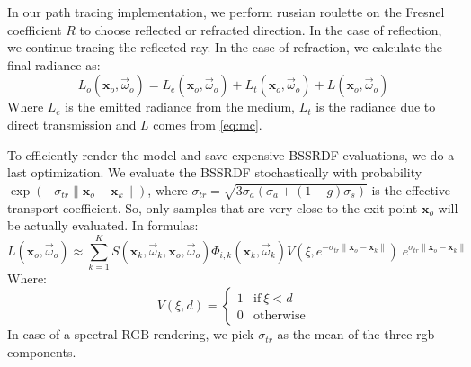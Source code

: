 \documentclass[10pt,a4paper]{article}
\begin{document}
In our path tracing implementation, we perform russian roulette on the Fresnel coefficient $R$ to choose reflected or refracted direction. In the case of reflection, we continue tracing the reflected ray. In the case of refraction, we calculate the final radiance as:
\begin{equation*}
L_o(\mathbf{x}_o, \vec{\omega}_o) = L_e(\mathbf{x}_o, \vec{\omega}_o) + L_t(\mathbf{x}_o, \vec{\omega}_o) + L(\mathbf{x}_o, \vec{\omega}_o) 
\end{equation*}
Where $L_e$ is the emitted radiance from the medium, $L_t$ is the radiance due to direct transmission and $L$ comes from \ref{eq:mc}. 

To efficiently render the model and save expensive BSSRDF evaluations, we do a last optimization. We evaluate the BSSRDF stochastically with probability $\exp(-\sigma_{tr} \| \mathbf{x}_o - \mathbf{x}_k \|)$, where $\sigma_{tr} = \sqrt{3 \sigma_a (\sigma_a + (1-g) \sigma_s)} $ is the effective transport coefficient.  So, only samples that are very close to the exit point $\mathbf{x}_o$ will be actually evaluated. In formulas:
\begin{equation*}
L(\mathbf{x}_o, \vec{\omega}_o) \approx  \sum_{k = 1}^K S(\mathbf{x}_k, \vec{\omega}_k, \mathbf{x}_o, \vec{\omega}_o) \Phi_{i,k}(\mathbf{x}_k, \vec{\omega}_k) V(\xi, e^{-\sigma_{tr} \| \mathbf{x}_o - \mathbf{x}_k \|})\; e^{\sigma_{tr} \| \mathbf{x}_o - \mathbf{x}_k \|}
\end{equation*}
Where:
\begin{equation*}
V(\xi, d) = \begin{cases}
1 & \text{if} \ \xi < d \\
0 & \text{otherwise}
\end{cases}
\end{equation*}
In case of a spectral RGB rendering, we pick $\sigma_{tr}$ as the mean of the three rgb components. 
\end{document}
